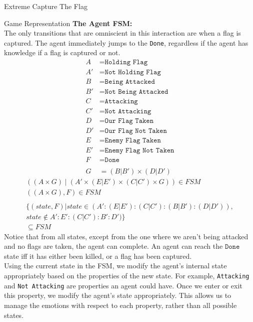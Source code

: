 \documentclass[11pt]{article}
\begin{document}
\begin{section}{Extreme Capture The Flag}
\begin{subsection}{Game Representation}
\textbf{The Agent FSM:}\\
The only transitions that are omniscient in this interaction are when a flag is captured. The agent immediately 
jumps to the \texttt{Done}, regardless if the agent has knowledge if a flag is captured or not. 
\begin{align*}
A &= \texttt{Holding Flag}\\
A' &= \texttt{Not Holding Flag}\\
B &= \texttt{Being Attacked}\\
B' &= \texttt{Not Being Attacked}\\
C &= \texttt{Attacking}\\
C' &= \texttt{Not Attacking}\\
D &= \texttt{Our Flag Taken}\\
D' &= \texttt{Our Flag Not Taken}\\
E &= \texttt{Enemy Flag Taken}\\
E' &= \texttt{Enemy Flag Not Taken}\\
F &= \texttt{Done}\\
\\
G &= (B|B')\times(D|D')
\end{align*}
\[\begin{array}{c}
((A\times G)\;|\;(A'\times(E|E')\times (C|C')\times G))\in FSM\\
((A\times G), F) \in FSM\\
\\
\{(state, F) | state \in (A': (E|E'):(C|C'):(B|B'):(D|D')), \\
state\notin A': E':(C|C'):B':D')\} \\
\subseteq FSM
\end{array}\]
Notice that from all states, except from the one where we aren't being attacked and no flags are taken, the agent can complete. An agent can reach the $\texttt{Done}$ state iff it has either been killed, or a flag has been captured.\\

Using the current state in the FSM, we modify the agent's internal state appropriately based on the properties of the new state. For example, \texttt{Attacking} and \texttt{Not Attacking} are properties an agent could have. Once we enter or exit this property, we modify the agent's state appropriately. This allows us to manage the emotions with respect to each property, rather than all possible states.
\end{subsection}
\end{section}
\end{document}

